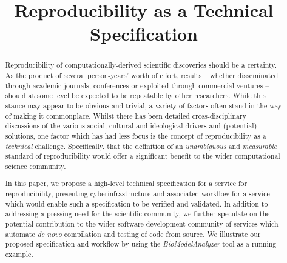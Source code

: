 \documentclass[conference]{IEEEtran}
\begin{document}
\title{Reproducibility as a Technical Specification}


\author{
\and
{}
\and
{}
}







\maketitle


\begin{abstract}
Reproducibility of computationally-derived scientific discoveries
should be a certainty. As the product of several person-years' worth
of effort, results -- whether disseminated through academic journals,
conferences or exploited through commercial ventures -- should at some
level be expected to be repeatable by other researchers. While this
stance may appear to be obvious and trivial, a variety of factors
often stand in the way of making it commonplace. Whilst there has been
detailed cross-disciplinary discussions of the various social,
cultural and ideological drivers and (potential) solutions, one factor
which has had less focus is the concept of reproducibility as a
\emph{technical} challenge. Specifically, that the definition of an
\emph{unambiguous} and \emph{measurable} standard of reproducibility
would offer a significant benefit to the wider computational science
community.

In this paper, we propose a high-level technical specification for a
service for reproducibility, presenting cyberinfrastructure and
associated workflow for a service which would enable such a
specification to be verified and validated. In addition to addressing
a pressing need for the scientific community, we further speculate on
the potential contribution to the wider software development community
of services which automate \emph{de novo} compilation and testing of
code from source. We illustrate our proposed specification and
workflow by using the {\emph{BioModelAnalyzer}} tool as a running
example.
\end{abstract}
\end{document}
